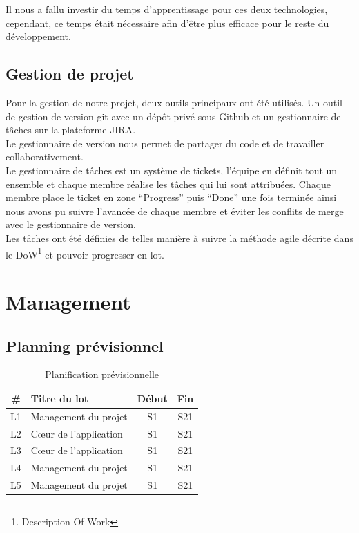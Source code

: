 \documentclass{sigplanconf}
\begin{document}
Il nous a fallu investir du temps d'apprentissage pour ces deux technologies, cependant, ce temps était nécessaire afin d'être plus efficace pour le reste du développement.

\subsection{Gestion de projet}
Pour la gestion de notre projet, deux outils principaux ont été utilisés. Un outil de gestion de version git avec un dépôt privé sous Github et un gestionnaire de tâches sur la plateforme JIRA.\\
Le gestionnaire de version nous permet de partager du code et de travailler collaborativement.\\
Le gestionnaire de tâches est un système de tickets, l’équipe en définit tout un ensemble et chaque membre réalise les tâches qui lui sont attribuées. Chaque membre place le ticket en zone “Progress” puis “Done” une fois terminée ainsi nous avons pu suivre l’avancée de chaque membre et éviter les conflits de merge avec le gestionnaire de version.\\
Les tâches ont été définies de telles manière à suivre la méthode agile décrite dans le DoW\footnote{Description Of Work} et pouvoir progresser en lot.

\section{Management}%
\subsection{Planning prévisionnel}
\begin{table}
\begin{center}
\begin{tabular}{|c|l|c|c|}
\hline
 \# & Titre du lot & Début & Fin \\ \hline
L1 & Management du projet & S1 & S21\\
L2 & Cœur de l'application & S1 & S21\\
L3 & Cœur de l'application & S1 & S21\\
L4 & Management du projet & S1 & S21\\
L5 & Management du projet & S1 & S21\\
\end{tabular}
\end{center}
\caption{Planification prévisionnelle}\label{planifPrev}
\end{table}
\end{document}
